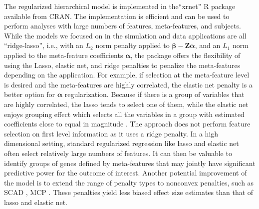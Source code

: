 The regularized hierarchical model is implemented in the``xrnet'' R package available from CRAN. The implementation is efficient and can be used to perform analyses with large numbers of features, meta-features, and subjects. While the models we focused on in the simulation and data applications are all “ridge-lasso”, i.e., with an $L_2$ norm penalty applied to $\bm{\beta}-\bm{Z\alpha}$, and an $L_1$ norm applied to the meta-feature coefficients $\bm{\alpha}$, the package offers the flexibility of using the Lasso, elastic net, and ridge penalties to penalize the meta-features depending on the application.  For example, if selection at the meta-feature level is desired and the meta-features are highly correlated, the elastic net penalty is a better option for $\bm{\alpha}$ regularization. Because if there is a group of variables that are highly correlated, the lasso tends to select one of them, while the elastic net enjoys grouping effect which selects all the variables in a group with estimated coefficients close to equal in magnitude \citep{zou2005regularization}. The approach does not perform feature selection on first level information as it uses a ridge penalty. In a high dimensional setting, standard regularized regression like lasso and elastic net often select relatively large numbers of features. It can then be valuable to identify groups of genes defined by meta-features that may jointly have significant predictive power for the outcome of interest. Another potential improvement of the model is to extend the range of penalty types to nonconvex penalties, such as SCAD \citep{fan2001variable}, MCP \citep{zhang2010nearly}. These penalties yield less biased effect size estimates than that of lasso and elastic net.

